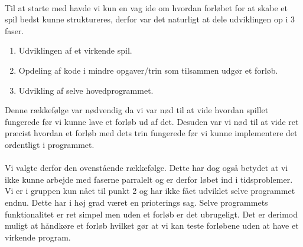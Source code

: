\documentclass[10pt,a4paper,danish]{article}
\begin{document}
\paragraph{}
Til at starte med havde vi kun en vag ide om hvordan forløbet for at skabe et spil bedst kunne struktureres, derfor var det naturligt at dele udviklingen op i 3 faser.
\begin{enumerate}
  \item Udviklingen af et virkende spil.
  \item Opdeling af kode i mindre opgaver/trin som tilsammen udgør et forløb.
  \item Udvikling af selve hovedprogrammet.
\end{enumerate}
Denne rækkefølge var nødvendig da vi var nød til at vide hvordan spillet fungerede før vi kunne lave et forløb ud af det. Desuden var vi nød til at vide ret præcist hvordan et forløb med dets trin fungerede før vi kunne implementere det ordentligt i programmet.

\paragraph{}
Vi valgte derfor den ovenstående rækkefølge. Dette har dog også betydet at vi ikke kunne arbejde med faserne parralelt og er derfor løbet ind i tidsproblemer. Vi er i gruppen kun nået til punkt 2 og har ikke fået udviklet selve programmet endnu.
Dette har i høj grad været en prioterings sag. Selve programmets funktionalitet er ret simpel men uden et forløb er det ubrugeligt. Det er derimod muligt at håndkøre et forløb hvilket gør at vi kan teste forløbene uden at have et virkende program.
\end{document}
